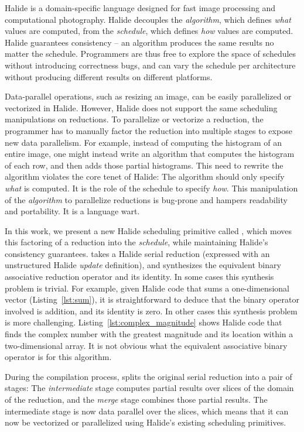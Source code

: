 Halide \cite{Ragan-Kelley:2013:HLC:2491956.2462176} is a domain-specific language designed for fast image processing and computational photography. Halide decouples the \emph{algorithm}, which defines \emph{what} values are computed, from the \emph{schedule}, which defines \emph{how} values are computed. Halide guarantees consistency -- an algorithm produces the same results no matter the schedule. Programmers are thus free to explore the space of schedules without introducing correctness bugs, and can vary the schedule per architecture without producing different results on different platforms.

Data-parallel operations, such as resizing an image, can be easily parallelized or vectorized in Halide. However, Halide does not support the same scheduling manipulations on reductions. To parallelize or vectorize a reduction, the programmer has to manually factor the reduction into multiple stages to expose new data parallelism. For example, instead of computing the histogram of an entire image, one might instead write an algorithm that computes the histogram of each row, and then adds those partial histograms. This need to rewrite the algorithm violates the core tenet of Halide: The algorithm should only specify \emph{what} is computed. It is the role of the schedule to specify \emph{how}. This manipulation of the \emph{algorithm} to parallelize reductions is bug-prone and hampers readability and portability. It is a language wart.

In this work, we present a new Halide scheduling primitive called , which moves this factoring of a reduction into the \emph{schedule}, while maintaining Halide's consistency guarantees.  takes a Halide serial reduction (expressed with an unstructured Halide \emph{update} definition), and synthesizes the equivalent binary associative reduction operator and its identity. In some cases this synthesis problem is trivial. For example, given Halide code that sums a one-dimensional vector (Listing~\ref{lst:sum}), it is straightforward to deduce that the binary operator involved is addition, and its identity is zero. In other cases this synthesis problem is more challenging. Listing~\ref{lst:complex_magnitude} shows Halide code that finds the complex number with the greatest magnitude and its location within a two-dimensional array. It is not obvious what the equivalent associative binary operator is for this algorithm.

During the compilation process,  splits the original serial reduction into a pair of stages: The \emph{intermediate} stage computes partial results over slices of the domain of the reduction, and the \emph{merge} stage combines those partial results. The intermediate stage is now data parallel over the slices, which means that it can now be vectorized or parallelized using Halide's existing scheduling primitives.

